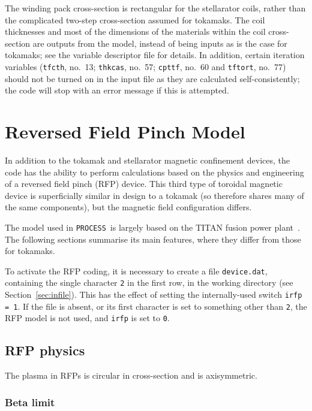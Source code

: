 \documentclass[11pt,a4paper]{report}
\newcommand{\process}{\mbox{\texttt{PROCESS}}}
\begin{document}
The winding pack cross-section is rectangular for the stellarator coils,
rather than the complicated two-step cross-section assumed for tokamaks. The
coil thicknesses and most of the dimensions of the materials within the coil
cross-section are outputs from the model, instead of being inputs as is the
case for tokamaks; see the variable descriptor file for details. In addition,
certain iteration variables (\texttt{tfcth}, no.\ 13; \texttt{thkcas}, no.\
57; \texttt{cpttf}, no.\ 60 and \texttt{tftort}, no.\ 77) should not be turned
on in the input file as they are calculated self-consistently; the code will
stop with an error message if this is attempted.

\section{Reversed Field Pinch Model}

In addition to the tokamak and stellarator magnetic confinement devices, the
code has the ability to perform calculations based on the physics and
engineering of a reversed field pinch (RFP) device. This third type of
toroidal magnetic device is superficially similar in design to a tokamak (so
therefore shares many of the same components), but the magnetic field
configuration differs.

The model used in \process\ is largely based on the TITAN fusion power
plant~\cite{titan1,titan2}. The following sections summarise its main
features, where they differ from those for tokamaks.

To activate the RFP coding, it is necessary to create a file
\texttt{device.dat}, containing the single character \texttt{2} in the first
row, in the working directory (see Section~\ref{sec:infile}). This has the
effect of setting the internally-used switch \texttt{irfp = 1}. If the file is
absent, or its first character is set to something other than \texttt{2}, the
RFP model is not used, and \texttt{irfp} is set to \texttt{0}.

\subsection{RFP physics}

The plasma in RFPs is circular in cross-section and is axisymmetric.

\subsubsection{Beta limit}
\end{document}
